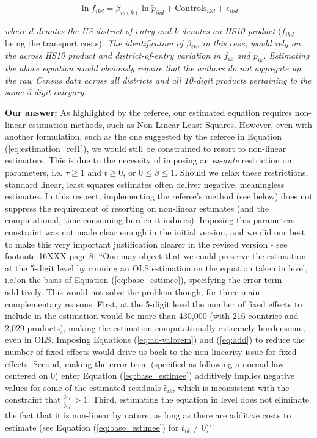 \documentclass[a4paper,12pt]{article}
\begin{document}
\begin{equation}
\ln f_{ikd} = \beta_{is(k)}\ln \tilde{p}_{ikd} + \text{Controls}_{ikd} +\epsilon_{ikd} \label{eq:estimation_ref1}
\end{equation}

\textit{where $d$ denotes the US district of entry and $k$ denotes an HS10 product} ($f_{ikd}$ being the transport costs). \textit{The
identification of $\beta_{ik}$, in this case, would rely on the across HS10 product and
district-of-entry variation in $f_{ik}$ and $p_{ik}$. Estimating the above equation would
obviously require that the authors do not aggregate up the raw Census data
across all districts and all 10-digit products pertaining to the same 5-digit category.}

\textbf{Our answer:}
As highlighted by the referee, our estimated equation requires non-linear estimation methods, such as Non-Linear Least Squares. However, even with another formulation, such as the one suggested by the referee in Equation (\ref{eq:estimation_ref1}), we would still be constrained to resort to non-linear estimators. This is due to the necessity of imposing an \textit{ex-ante} restriction on parameters, i.e. $\tau \geq 1$ and $t \geq 0$, or $0 \leq  \beta \leq 1$. Should we relax these restrictions, standard linear, least squares estimates often deliver negative, meaningless estimates. In this respect, implementing the referee's method (see below) does not suppress the requirement of resorting on non-linear estimates (and the computational, time-consuming burden it induces). Imposing this parameters constraint was not made clear enough in the initial version, and we did our best to make this very important justification clearer in the revised version - see footnote 16XXX page 8: ``One may object that we could preserve the estimation at the 5-digit level by running an OLS estimation on the equation taken in level, i.e.`on the basis of Equation (\ref{eq:base_estimee}), specifying the error term additively. This would not solve the problem though, for three main complementary reasons.
First, at the 5-digit level the number of fixed effects to include in the estimation would be more than 430,000 (with 216 countries and 2,029 products), making the estimation computationally extremely burdensome, even in OLS.
Imposing Equations (\ref{eq:ad-valorem}) and (\ref{eq:add}) to reduce the number of fixed effects would drive us back to the non-linearity issue for fixed effects.
Second, making the error term (specified as following a normal law centered on 0) enter Equation (\ref{eq:base_estimee}) additively implies negative values for some of the estimated residuals $\widehat{\epsilon}_{ik}$, which is inconsistent with the constraint that $\frac{p_{ik}}{\widetilde{p}_{ik}}>1$.
Third, estimating the equation in level does not eliminate the fact that it is non-linear by nature, as long as there are additive costs to estimate (see Equation (\ref{eq:base_estimee}) for $t_{ik} \neq 0$)''
\end{document}
